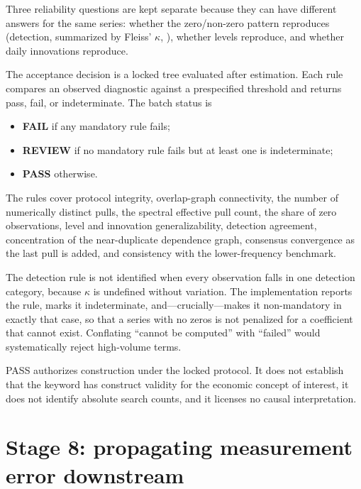\documentclass[12pt,a4paper,oneside]{article}
\begin{document}
Three reliability questions are kept separate because they can have different
answers for the same series: whether the zero/non-zero pattern reproduces
(detection, summarized by Fleiss' $\kappa$, \citealp{Fleiss1971}), whether
levels reproduce, and whether daily innovations reproduce.

The acceptance decision is a locked tree evaluated after estimation. Each rule
compares an observed diagnostic against a prespecified threshold and returns
pass, fail, or indeterminate. The batch status is
\begin{itemize}
\item \textbf{FAIL} if any mandatory rule fails;
\item \textbf{REVIEW} if no mandatory rule fails but at least one is
indeterminate;
\item \textbf{PASS} otherwise.
\end{itemize}

The rules cover protocol integrity, overlap-graph connectivity, the number of
numerically distinct pulls, the spectral effective pull count, the share of zero
observations, level and innovation generalizability, detection agreement,
concentration of the near-duplicate dependence graph, consensus convergence as
the last pull is added, and consistency with the lower-frequency benchmark.

\begin{remark}
The detection rule is not identified when every observation falls in one
detection category, because $\kappa$ is undefined without variation. The
implementation reports the rule, marks it indeterminate, and---crucially---makes
it non-mandatory in exactly that case, so that a series with no zeros is not
penalized for a coefficient that cannot exist. Conflating ``cannot be computed''
with ``failed'' would systematically reject high-volume terms.
\end{remark}

\begin{remark}
PASS authorizes construction under the locked protocol. It does not establish
that the keyword has construct validity for the economic concept of interest, it
does not identify absolute search counts, and it licenses no causal
interpretation.
\end{remark}

\section{Stage 8: propagating measurement error downstream}\label{sec:eiv}
\end{document}

